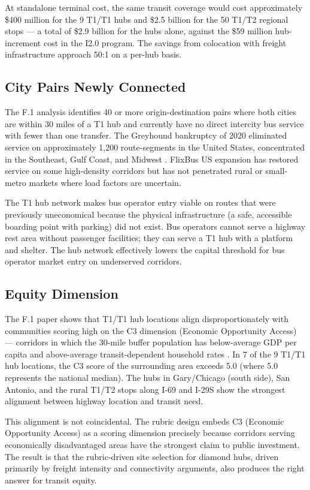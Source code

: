 At standalone terminal cost, the same transit coverage would cost approximately \$400 million for the 9 T1/T1 hubs and \$2.5 billion for the 50 T1/T2 regional stops --- a total of \$2.9 billion for the hubs alone, against the \$59 million hub-increment cost in the I2.0 program. The savings from colocation with freight infrastructure approach 50:1 on a per-hub basis.

\subsection{City Pairs Newly Connected}

The F.1 analysis identifies 40 or more origin-destination pairs where both cities are within 30 miles of a T1 hub and currently have no direct intercity bus service with fewer than one transfer. The Greyhound bankruptcy of 2020 eliminated service on approximately 1,200 route-segments in the United States, concentrated in the Southeast, Gulf Coast, and Midwest \citep{Amtrak2023}. FlixBus US expansion has restored service on some high-density corridors but has not penetrated rural or small-metro markets where load factors are uncertain.

The T1 hub network makes bus operator entry viable on routes that were previously uneconomical because the physical infrastructure (a safe, accessible boarding point with parking) did not exist. Bus operators cannot serve a highway rest area without passenger facilities; they can serve a T1 hub with a platform and shelter. The hub network effectively lowers the capital threshold for bus operator market entry on underserved corridors.

\subsection{Equity Dimension}

The F.1 paper shows that T1/T1 hub locations align disproportionately with communities scoring high on the C3 dimension (Economic Opportunity Access) --- corridors in which the 30-mile buffer population has below-average GDP per capita and above-average transit-dependent household rates \citep{ACS_B08201_2022}. In 7 of the 9 T1/T1 hub locations, the C3 score of the surrounding area exceeds 5.0 (where 5.0 represents the national median). The hubs in Gary/Chicago (south side), San Antonio, and the rural T1/T2 stops along I-69 and I-29S show the strongest alignment between highway location and transit need.

This alignment is not coincidental. The rubric design embeds C3 (Economic Opportunity Access) as a scoring dimension precisely because corridors serving economically disadvantaged areas have the strongest claim to public investment. The result is that the rubric-driven site selection for diamond hubs, driven primarily by freight intensity and connectivity arguments, also produces the right answer for transit equity.


